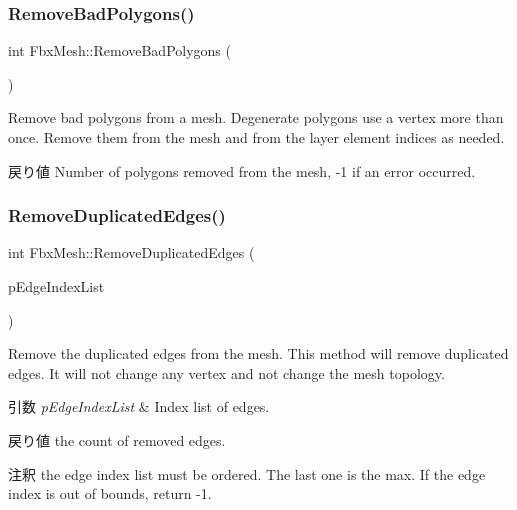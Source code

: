 \mbox{\label{class_fbx_mesh_a90bd43a9b7cc882a78af1e3ed0cf9171}} 
\subsubsection{\texorpdfstring{Remove\+Bad\+Polygons()}{RemoveBadPolygons()}}
{\footnotesize\ttfamily int Fbx\+Mesh\+::\+Remove\+Bad\+Polygons (\begin{DoxyParamCaption}{ }\end{DoxyParamCaption})}

Remove bad polygons from a mesh. Degenerate polygons use a vertex more than once. Remove them from the mesh and from the layer element indices as needed. \begin{DoxyReturn}{戻り値}
Number of polygons removed from the mesh, -\/1 if an error occurred. 
\end{DoxyReturn}
\mbox{\label{class_fbx_mesh_a5e7104d87f03542c0fc040ae1f7f593d}} 
\subsubsection{\texorpdfstring{Remove\+Duplicated\+Edges()}{RemoveDuplicatedEdges()}}
{\footnotesize\ttfamily int Fbx\+Mesh\+::\+Remove\+Duplicated\+Edges (\begin{DoxyParamCaption}\item[{\hyperlink{class_fbx_array}{Fbx\+Array}$<$ int $>$ \&}]{p\+Edge\+Index\+List }\end{DoxyParamCaption})}

Remove the duplicated edges from the mesh. This method will remove duplicated edges. It will not change any vertex and not change the mesh topology. 
\begin{DoxyParams}{引数}
{\em p\+Edge\+Index\+List} & Index list of edges. \\
\hline
\end{DoxyParams}
\begin{DoxyReturn}{戻り値}
the count of removed edges. 
\end{DoxyReturn}
\begin{DoxyRemark}{注釈}
the edge index list must be ordered. The last one is the max. If the edge index is out of bounds, return -\/1. 
\end{DoxyRemark}
\mbox{\label{class_fbx_mesh_aad5e2768669d5c94e8d96d7d65fcab68}} 
